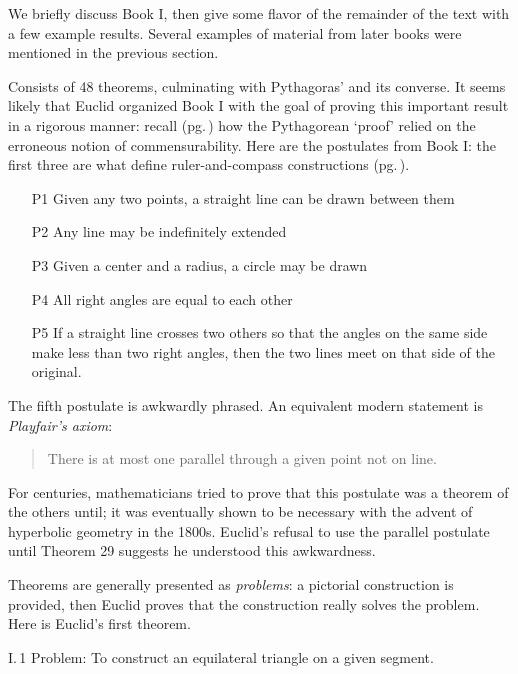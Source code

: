We briefly discuss Book I, then give some flavor of the remainder of the text with a few example results. Several examples of material from later books were mentioned in the previous section.



Consists of 48 theorems, culminating with Pythagoras' and its converse. It seems likely that Euclid organized Book I with the goal of proving this important result in a rigorous manner: recall (pg.\,\pageref{pthagorig}) how the Pythagorean `proof' relied on the erroneous notion of commensurability. Here are the postulates from Book I: the first three are what define ruler-and-compass constructions (pg.\,\pageref{pg:construction}).

\begin{itemize}\itemsep0pt
  \item[P1] Given any two points, a straight line can be drawn between them
  \item[P2] Any line may be indefinitely extended
  \item[P3] Given a center and a radius, a circle may be drawn
  \item[P4] All right angles are equal to each other
  \item[P5] If a straight line crosses two others so that the angles on the same side make less than two right angles, then the two lines meet on that side of the original.
\end{itemize}

The fifth postulate is awkwardly phrased. An equivalent modern statement is \emph{Playfair's axiom}:
\begin{quote}
	There is at most one parallel through a given point not on line.
\end{quote}
For centuries, mathematicians tried to prove that this postulate was a theorem of the others until; it was eventually shown to be necessary with the advent of hyperbolic geometry in the 1800s. Euclid's refusal to use the parallel postulate until Theorem 29 suggests he understood this awkwardness.\smallbreak


Theorems are generally presented as \emph{problems}: a pictorial construction is provided, then Euclid proves that the construction really solves the problem. Here is Euclid's first theorem.

\begin{thm*}{I.\,1}{}\label{pg:euclidI1}
	Problem: To construct an equilateral triangle on a given segment.
\end{thm*}

